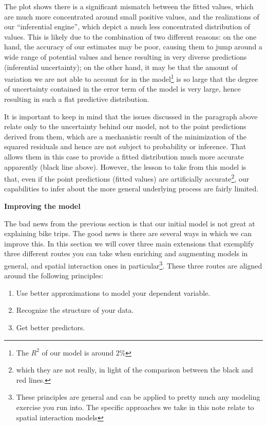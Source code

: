 \documentclass[
]{book}
\providecommand{\tightlist}{%
  \setlength{\itemsep}{0pt}\setlength{\parskip}{0pt}}
\begin{document}
The plot shows there is a significant mismatch between the fitted values, which are much more concentrated around small positive values, and the realizations of our ``inferential engine'', which depict a much less concentrated distribution of values. This is likely due to the combination of two different reasons: on the one hand, the accuracy of our estimates may be poor, causing them to jump around a wide range of potential values and hence resulting in very diverse predictions (inferential uncertainty); on the other hand, it may be that the amount of variation we are not able to account for in the model\footnote{The \(R^2\) of our model is around 2\%} is so large that the degree of uncertainty contained in the error term of the model is very large, hence resulting in such a flat predictive distribution.

It is important to keep in mind that the issues discussed in the paragraph above relate only to the uncertainty behind our model, not to the point predictions derived from them, which are a mechanistic result of the minimization of the squared residuals and hence are not subject to probability or inference. That allows them in this case to provide a fitted distribution much more accurate apparently (black line above). However, the lesson to take from this model is that, even if the point predictions (fitted values) are artificially accurate\footnote{which they are not really, in light of the comparison between the black and red lines.}, our capabilities to infer about the more general underlying process are fairly limited.

\textbf{Improving the model}

The bad news from the previous section is that our initial model is not great at explaining bike trips. The good news is there are several ways in which we can improve this. In this section we will cover three main extensions that exemplify three different routes you can take when enriching and augmenting models in general, and spatial interaction ones in particular\footnote{These principles are general and can be applied to pretty much any modeling exercise you run into. The specific approaches we take in this note relate to spatial interaction models}. These three routes are aligned around the following principles:

\begin{enumerate}
\def\labelenumi{\arabic{enumi}.}
\tightlist
\item
  Use better approximations to model your dependent variable.
\item
  Recognize the structure of your data.
\item
  Get better predictors.
\end{enumerate}
\end{document}
